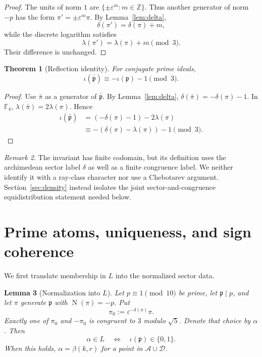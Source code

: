\documentclass[12pt]{amsart}
\newtheorem{theorem}{Theorem}[section]
\newtheorem{lemma}[theorem]{Lemma}
\theoremstyle{definition}
\theoremstyle{remark}
\newtheorem{remark}[theorem]{Remark}
\DeclareMathOperator{\N}{N}
\newcommand{\ZZ}{\mathbb{Z}}
\newcommand{\FF}{\mathbb{F}}
\newcommand{\eps}{\varepsilon}
\newcommand{\Acone}{\mathcal{A}}
\newcommand{\Dcone}{\mathcal{D}}
\begin{document}
\begin{proof}
The units of norm $1$ are $\{\pm\eps^m:m\in\ZZ\}$.  Thus another
generator of norm $-p$ has the form $\pi'=\pm\eps^m\pi$.  By
Lemma~\ref{lem:delta},
\[
  \delta(\pi')=\delta(\pi)+m,
\]
while the discrete logarithm satisfies
\[
  \lambda(\pi')=\lambda(\pi)+m\pmod3.
\]
Their difference is unchanged.
\end{proof}

\begin{theorem}[Reflection identity]\label{thm:reflection}
For conjugate prime ideals,
\[
  \iota(\bar{\mathfrak p})
  \equiv-\iota(\mathfrak p)-1\pmod3.
\]
\end{theorem}

\begin{proof}
Use $\bar\pi$ as a generator of $\bar{\mathfrak p}$.  By
Lemma~\ref{lem:delta},
$\delta(\bar\pi)=-\delta(\pi)-1$.  In $\FF_4$,
$\lambda(\bar\pi)=2\lambda(\pi)$.  Hence
\begin{align*}
\iota(\bar{\mathfrak p})
&=(-\delta(\pi)-1)-2\lambda(\pi)\\
&\equiv-(\delta(\pi)-\lambda(\pi))-1
 \pmod3.
\end{align*}
\end{proof}

\begin{remark}
The invariant has finite codomain, but its definition uses the
archimedean sector label $\delta$ as well as a finite congruence label.
We neither identify it with a ray-class character nor use a
Chebotarev argument.  Section~\ref{sec:density} instead isolates the
joint sector-and-congruence equidistribution statement needed below.
\end{remark}

\section{Prime atoms, uniqueness, and sign coherence}\label{sec:prime}

We first translate membership in $L$ into the normalized sector data.

\begin{lemma}[Normalization into $L$]\label{lem:normalization}
Let $p\equiv1\pmod{10}$ be prime, let $\mathfrak p\mid p$, and let
$\pi$ generate $\mathfrak p$ with $\N(\pi)=-p$.  Put
\[
  \pi_0:=\eps^{-\delta(\pi)}\pi.
\]
Exactly one of $\pi_0$ and $-\pi_0$ is congruent to $3$ modulo
$\sqrt5$.  Denote that choice by $\alpha$.  Then
\[
  \alpha\in L
  \quad\Longleftrightarrow\quad
  \iota(\mathfrak p)\in\{0,1\}.
\]
When this holds, $\alpha=\beta(k,r)$ for a point in
$\Acone\cup\Dcone$.
\end{lemma}
\end{document}
